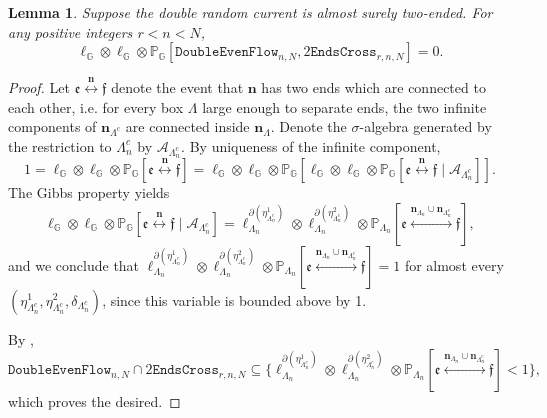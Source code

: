 \documentclass[10pt,a4paper]{amsart}
\newtheorem{lemma}{Lemma}
\newcommand{\cc}{\leftrightarrow}
\newcommand{\nn}{\mathbf{n}}
\begin{document}
\begin{lemma}\label{lemma:even_flow_is_impossible} Suppose the double random current is almost surely two-ended.
For any positive integers $r <n<N$,  $$ \ell_{\mathbb{G}}  \otimes \ell_{\mathbb{G}} \otimes \mathbb{P}_{\mathbb{G}}[\mathtt{DoubleEvenFlow}_{n,N} , 2\mathtt{EndsCross}_{r,n,N}] = 0.$$
\end{lemma}

\begin{proof}

Let $\mathfrak{e}\overset{\nn}{\cc} \mathfrak{f}$ denote the event that $\nn$ has two ends which are connected to each other, i.e. for every box $\Lambda$ large enough to separate ends, the two infinite components of $\nn_{\Lambda^c}$ are connected inside $\nn_{\Lambda}$. Denote the $\sigma$-algebra generated by the restriction to $\Lambda_{n}^c$ by  $\mathcal{A}_{\Lambda_n^c}$.
By uniqueness of the infinite component, 
$$
1=\ell_{\mathbb{G}}\otimes \ell_{\mathbb{G}}\otimes \mathbb{P}_{\mathbb{G}}[\mathfrak{e}\overset{\nn}{\cc} \mathfrak{f}]=\ell_{\mathbb{G}}\otimes \ell_{\mathbb{G}}\otimes \mathbb{P}_{\mathbb{G}}[\ell_{\mathbb{G}}\otimes \ell_{\mathbb{G}}\otimes \mathbb{P}_{\mathbb{G}}[\mathfrak{e}\overset{\nn}{\cc} \mathfrak{f}\mid \mathcal{A}_{\Lambda_n^c}]].
$$
The Gibbs property yields $$
\ell_{\mathbb{G}}\otimes \ell_{\mathbb{G}}\otimes \mathbb{P}_{\mathbb{G}}[\mathfrak{e}\overset{\nn}{\cc} \mathfrak{f}\mid \mathcal{A}_{\Lambda_n^c}]=\ell_{\Lambda_n}^{\partial(\eta^1_{\Lambda_n^c})}\otimes \ell_{\Lambda_n}^{\partial(\eta^2_{\Lambda_n^c})}\otimes \mathbb{P}_{\Lambda_n}[\mathfrak{e}\overset{\nn_{\Lambda_n}\cup \nn_{\Lambda_n^c}}{\cc} \mathfrak{f}],
$$
and
we conclude that $\ell_{\Lambda_n}^{\partial(\eta^1_{\Lambda_n^c})}\otimes \ell_{\Lambda_n}^{\partial(\eta^2_{\Lambda_n^c})}\otimes \mathbb{P}_{\Lambda_n}[\mathfrak{e}\overset{\nn_{\Lambda_n}\cup \nn_{\Lambda_n^c}}{\cc} \mathfrak{f}]=1$ for almost every $(\eta^1_{\Lambda_n^c},\eta^2_{\Lambda_n^c},\delta_{\Lambda_n^c})$, since this variable is bounded above by 1.

By , $\mathtt{DoubleEvenFlow}_{n,N} \cap 2\mathtt{EndsCross}_{r,n,N}\subseteq \{\ell_{\Lambda_n}^{\partial(\eta^1_{\Lambda_n^c})}\otimes \ell_{\Lambda_n}^{\partial(\eta^2_{\Lambda_n^c})}\otimes \mathbb{P}_{\Lambda_n}[\mathfrak{e}\overset{\nn_{\Lambda_n}\cup \nn_{\Lambda_n^c}}{\cc} \mathfrak{f}]<1\},$ which proves the desired.
\end{proof}
\end{document}
